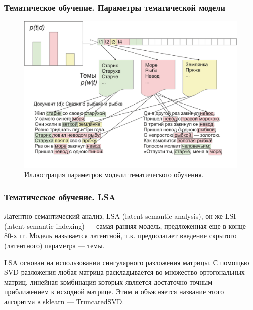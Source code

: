 \documentclass[ucs, notheorems, handout]{beamer}
\begin{document}
	\begin{frame}
	\frametitle{Тематическое обучение. Параметры тематической модели }
	

\begin{figure}[H]
	\begin{center}
		\includegraphics[scale = 1]{TM.png}
		\caption{Иллюстрация параметров модели тематического обучения.}
	\end{center}
\end{figure}
	\end{frame}
	
	\begin{frame}
	\frametitle{Тематическое обучение. LSA}
	
Латентно-семантический анализ, LSA (latent semantic analysis), он же LSI (latent semantic indexing) --- самая ранняя модель, предложенная еще в конце 80-х гг. Модель называется латентной, т.к. предполагает введение скрытого (латентного) параметра — темы.

LSA основан на использовании сингулярного разложения матрицы. С помощью SVD-разложения любая матрица раскладывается во множество ортогональных матриц, линейная комбинация которых является достаточно точным приближением к исходной матрице. Этим и объясняется название этого алгоритма в sklearn — TruncaredSVD.


	\end{frame}
	
\end{document}
